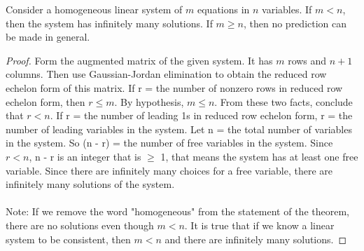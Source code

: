 \documentclass[12pt]{article}
\begin{document}
 \begin{theorem} Consider a homogeneous linear system of $m$ equations in $n$ variables. If $m < n$, then the system has infinitely many solutions. If $ m \geq n $, then no prediction can be made in general. \end{theorem} \newpage
 \begin{proof}
 Form the augmented matrix of the given system. It has $m$ rows and $n + 1$ columns. Then use Gaussian-Jordan elimination to obtain the reduced row echelon form of this matrix. If r = the number of nonzero rows in reduced row echelon form, then $r \leq m$. By hypothesis, $ m \leq n $. From these two facts, conclude that $ r < n $. If r = the number of leading 1s in reduced row echelon form, r = the number of leading variables in the system. Let n = the total number of variables in the system. So (n - r) = the number of free variables in the system. Since $ r < n $, n - r is an integer that is $\geq$ 1, that means the system has at least one free variable. Since there are infinitely many choices for a free variable, there are infinitely many solutions of the system. \\~\\ Note: If we remove the word "homogeneous" from the statement of the theorem, there are no solutions even though $ m < n $. It is true that if we know a linear system to be consistent, then $ m < n $ and there are infinitely many solutions. \end{proof}
 
\end{document}
